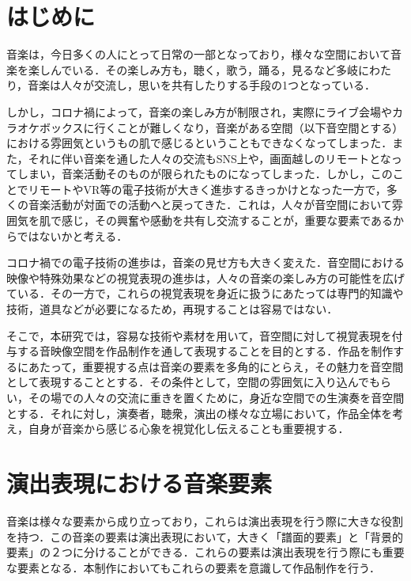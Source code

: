 
\section{はじめに}
音楽は，今日多くの人にとって日常の一部となっており，様々な空間において音楽を楽しんでいる．その楽しみ方も，聴く，歌う，踊る，見るなど多岐にわたり，音楽は人々が交流し，思いを共有したりする手段の1つとなっている．

しかし，コロナ禍によって，音楽の楽しみ方が制限され，実際にライブ会場やカラオケボックスに行くことが難しくなり，音楽がある空間（以下音空間とする）における雰囲気というもの肌で感じるということもできなくなってしまった．また，それに伴い音楽を通した人々の交流もSNS上や，画面越しのリモートとなってしまい，音楽活動そのものが限られたものになってしまった．しかし，このことでリモートやVR等の電子技術が大きく進歩するきっかけとなった一方で，多くの音楽活動が対面での活動へと戻ってきた．これは，人々が音空間において雰囲気を肌で感じ，その興奮や感動を共有し交流することが，重要な要素であるからではないかと考える．

コロナ禍での電子技術の進歩は，音楽の見せ方も大きく変えた．音空間における映像や特殊効果などの視覚表現の進歩は，人々の音楽の楽しみ方の可能性を広げている．その一方で，これらの視覚表現を身近に扱うにあたっては専門的知識や技術，道具などが必要になるため，再現することは容易ではない．

そこで，本研究では，容易な技術や素材を用いて，音空間に対して視覚表現を付与する音映像空間を作品制作を通して表現することを目的とする．作品を制作するにあたって，重要視する点は音楽の要素を多角的にとらえ，その魅力を音空間として表現することとする．その条件として，空間の雰囲気に入り込んでもらい，その場での人々の交流に重きを置くために，身近な空間での生演奏を音空間とする．それに対し，演奏者，聴衆，演出の様々な立場において，作品全体を考え，自身が音楽から感じる心象を視覚化し伝えることも重要視する．




\section{演出表現における音楽要素}\label{sec:music_factor}

音楽は様々な要素から成り立っており，これらは演出表現を行う際に大きな役割を持つ．この音楽の要素は演出表現において，大きく「譜面的要素」と「背景的要素」の２つに分けることができる．これらの要素は演出表現を行う際にも重要な要素となる．本制作においてもこれらの要素を意識して作品制作を行う．
